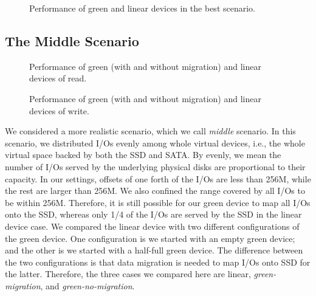 \begin{figure}[t]
\begin{centering}
\caption{Performance of green and linear devices in the best
scenario.}
\label{fig:best}
\end{centering}
\end{figure}

\subsection{The Middle Scenario}

\begin{figure}[t]
\begin{centering}
\caption{Performance of green (with and without migration) and linear
devices of read.}
\label{fig:evenread}
\end{centering}
\end{figure}

\begin{figure}[t]
\begin{centering}
\caption{Performance of green (with and without migration) and linear
devices of write.}
\label{fig:evenwrite}
\end{centering}
\end{figure}

We considered a more realistic scenario, which we call \textit{middle}
scenario. In this scenario, we distributed I/Os evenly among whole
virtual devices, i.e., the whole virtual space backed by both the SSD
and SATA.  By evenly, we mean the number of I/Os served by the
underlying physical disks are proportional to their capacity.  In our
settings, offsets of one forth of the I/Os are less than 256M, while
the rest are larger than 256M.  We also confined the range covered by
all I/Os to be within 256M.  Therefore, it is still possible for our
green device to map all I/Os onto the SSD, whereas only 1/4 of the
I/Os are served by the SSD in the linear device case.  We compared the
linear device with two different configurations of the green device.
One configuration is we started with an empty green device; and the
other is we started with a half-full green device. The difference
between the two configurations is that data migration is needed to map
I/Os onto SSD for the latter. Therefore, the three cases we compared
here are linear, \textit{green-migration}, and
\textit{green-no-migration}.

